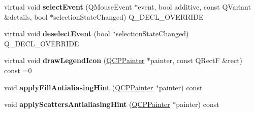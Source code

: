 \begin{DoxyCompactItemize}
\item 
virtual void {\bfseries select\+Event} (Q\+Mouse\+Event $\ast$event, bool additive, const Q\+Variant \&details, bool $\ast$selection\+State\+Changed) Q\+\_\+\+D\+E\+C\+L\+\_\+\+O\+V\+E\+R\+R\+I\+DE\hypertarget{class_q_c_p_abstract_plottable_ad8d84dab7ab1138e6e94b3c3f9a5cb0e}{}\label{class_q_c_p_abstract_plottable_ad8d84dab7ab1138e6e94b3c3f9a5cb0e}

\item 
virtual void {\bfseries deselect\+Event} (bool $\ast$selection\+State\+Changed) Q\+\_\+\+D\+E\+C\+L\+\_\+\+O\+V\+E\+R\+R\+I\+DE\hypertarget{class_q_c_p_abstract_plottable_ab8b5380cff6f96e6feb24c677e466587}{}\label{class_q_c_p_abstract_plottable_ab8b5380cff6f96e6feb24c677e466587}

\item 
virtual void {\bfseries draw\+Legend\+Icon} (\hyperlink{class_q_c_p_painter}{Q\+C\+P\+Painter} $\ast$painter, const Q\+RectF \&rect) const =0\hypertarget{class_q_c_p_abstract_plottable_a71c259f4f96533d12df152c446b17425}{}\label{class_q_c_p_abstract_plottable_a71c259f4f96533d12df152c446b17425}

\item 
void {\bfseries apply\+Fill\+Antialiasing\+Hint} (\hyperlink{class_q_c_p_painter}{Q\+C\+P\+Painter} $\ast$painter) const \hypertarget{class_q_c_p_abstract_plottable_ac08a480155895e674dbfe5a5670e0ff3}{}\label{class_q_c_p_abstract_plottable_ac08a480155895e674dbfe5a5670e0ff3}

\item 
void {\bfseries apply\+Scatters\+Antialiasing\+Hint} (\hyperlink{class_q_c_p_painter}{Q\+C\+P\+Painter} $\ast$painter) const \hypertarget{class_q_c_p_abstract_plottable_a753272ee225a62827e90c3e1e78de4b1}{}\label{class_q_c_p_abstract_plottable_a753272ee225a62827e90c3e1e78de4b1}

\end{DoxyCompactItemize}
